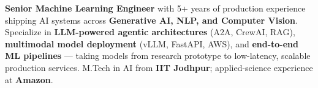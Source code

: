 \documentclass[letter,10pt]{article}
\begin{document}

\textbf{Senior Machine Learning Engineer} with 5+ years of production experience shipping AI systems across \textbf{Generative AI, NLP, and Computer Vision}.
Specialize in \textbf{LLM-powered agentic architectures} (A2A, CrewAI, RAG), \textbf{multimodal model deployment} (vLLM, FastAPI, AWS), and \textbf{end-to-end ML pipelines} — taking models from research prototype to low-latency, scalable production services.
M.Tech in AI from \textbf{IIT Jodhpur}; applied-science experience at \textbf{Amazon}.
\end{document}
